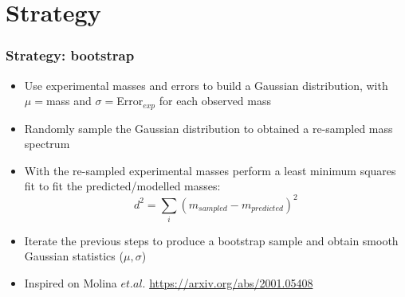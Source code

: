 \documentclass[10pt]{beamer}
\begin{document}
\section{Strategy}

\begin{frame}
\frametitle{Strategy: bootstrap}
\begin{beamerboxesrounded}[upper=uppercolor, lower=lowercolor, shadow=true]{} 
\begin{itemize}

\item Use experimental masses and errors to build a Gaussian distribution, with $\mu=$mass and $\sigma=$Error$_{exp}$ for each observed mass
\item Randomly sample the Gaussian distribution to obtained a re-sampled mass spectrum
\item With the re-sampled experimental masses perform a least minimum squares fit to fit the predicted/modelled masses:
\begin{equation}
d^{2}=\sum_{i}(m_{sampled}-m_{predicted})^{2}
\end{equation}

\item Iterate the previous steps to produce a bootstrap sample and obtain smooth Gaussian statistics ($\mu,\sigma$)
\item Inspired on Molina $et. al.$ \url{https://arxiv.org/abs/2001.05408}

\end{itemize}
\end{beamerboxesrounded}

\end{frame}
\end{document}
